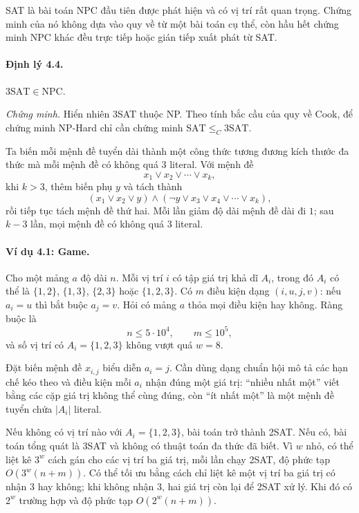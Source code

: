 \documentclass[11pt]{article}
\begin{document}
SAT là bài toán NPC đầu tiên được phát hiện và có vị trí rất quan trọng. Chứng
minh của nó không dựa vào quy về từ một bài toán cụ thể, còn hầu hết chứng minh
NPC khác đều trực tiếp hoặc gián tiếp xuất phát từ SAT.

\paragraph{Định lý 4.4.}
\(\mathrm{3SAT}\in\mathrm{NPC}\).

\emph{Chứng minh.}
Hiển nhiên 3SAT thuộc NP. Theo tính bắc cầu của quy về Cook, để chứng minh
NP-Hard chỉ cần chứng minh \(\mathrm{SAT}\le_C\mathrm{3SAT}\).

Ta biến mỗi mệnh đề tuyển dài thành một công thức tương đương kích thước đa
thức mà mỗi mệnh đề có không quá \(3\) literal. Với mệnh đề
\[
  x_1\lor x_2\lor\cdots\lor x_k,
\]
khi \(k>3\), thêm biến phụ \(y\) và tách thành
\[
  (x_1\lor x_2\lor y)\land
  (\neg y\lor x_3\lor x_4\lor\cdots\lor x_k),
\]
rồi tiếp tục tách mệnh đề thứ hai. Mỗi lần giảm độ dài mệnh đề dài đi \(1\);
sau \(k-3\) lần, mọi mệnh đề có không quá \(3\) literal.

\paragraph{Ví dụ 4.1: Game.}
Cho một mảng \(a\) độ dài \(n\). Mỗi vị trí \(i\) có tập giá trị khả dĩ
\(A_i\), trong đó \(A_i\) có thể là \(\{1,2\}\), \(\{1,3\}\), \(\{2,3\}\) hoặc
\(\{1,2,3\}\). Có \(m\) điều kiện dạng \((i,u,j,v)\): nếu \(a_i=u\) thì bắt
buộc \(a_j=v\). Hỏi có mảng \(a\) thỏa mọi điều kiện hay không. Ràng buộc là
\[
  n\le 5\cdot 10^4,\qquad m\le 10^5,
\]
và số vị trí có \(A_i=\{1,2,3\}\) không vượt quá \(w=8\).

Đặt biến mệnh đề \(x_{i,j}\) biểu diễn \(a_i=j\). Cần dùng dạng chuẩn hội mô tả
các hạn chế kéo theo và điều kiện mỗi \(a_i\) nhận đúng một giá trị: ``nhiều
nhất một'' viết bằng các cặp giá trị không thể cùng đúng, còn ``ít nhất một''
là một mệnh đề tuyển chứa \(|A_i|\) literal.

Nếu không có vị trí nào với \(A_i=\{1,2,3\}\), bài toán trở thành 2SAT. Nếu có,
bài toán tổng quát là 3SAT và không có thuật toán đa thức đã biết. Vì \(w\) nhỏ,
có thể liệt kê \(3^w\) cách gán cho các vị trí ba giá trị, mỗi lần chạy 2SAT,
độ phức tạp \(O(3^w(n+m))\). Có thể tối ưu bằng cách chỉ liệt kê một vị trí ba
giá trị có nhận \(3\) hay không; khi không nhận \(3\), hai giá trị còn lại để
2SAT xử lý. Khi đó có \(2^w\) trường hợp và độ phức tạp \(O(2^w(n+m))\).
\end{document}
